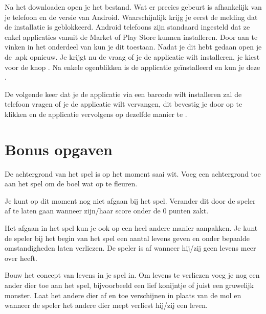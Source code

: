Na het downloaden open je het bestand. Wat er precies gebeurt is afhankelijk van je telefoon en de versie van Android. Waarschijnlijk krijg je eerst de melding dat de installatie is geblokkeerd. Android telefoons zijn standaard ingesteld dat ze enkel applicaties vanuit de Market of Play Store kunnen installeren. Door  aan te vinken in het  onderdeel van  kun je dit toestaan. Nadat je dit hebt gedaan open je de .apk opnieuw. Je krijgt nu de vraag of je de applicatie wilt installeren, je kiest voor de knop . Na enkele ogenblikken is de applicatie ge\"installeerd en kun je deze . 

De volgende keer dat je de applicatie via een barcode wilt installeren zal de telefoon vragen of je de applicatie wilt vervangen, dit bevestig je door op  te klikken en de applicatie vervolgens op dezelfde manier te .


\section{Bonus opgaven}
\begin{opgave}
    \opgVraag
  De achtergrond van het spel is op het moment saai wit.
  Voeg een achtergrond toe aan het spel om de boel wat op te fleuren.
\end{opgave}

\begin{opgave}
    \opgVraag
  Je kunt op dit moment nog niet afgaan bij het spel.
  Verander dit door de speler af te laten gaan wanneer zijn/haar score onder de 0 punten zakt.
\end{opgave}

Het afgaan in het spel kun je ook op een heel andere manier aanpakken. Je kunt de speler bij het begin van het spel een aantal levens geven en onder bepaalde omstandigheden laten verliezen. De speler is af wanneer hij/zij geen levens meer over heeft.

\begin{opgave}
    \opgVraag
  Bouw het concept van levens in je spel in. Om levens te verliezen voeg je nog een ander dier toe aan het spel, bijvoorbeeld een lief konijntje of juist een gruwelijk monster. Laat het andere dier af en toe verschijnen in plaats van de mol en wanneer de speler het andere dier mept verliest hij/zij een leven.
\end{opgave}
